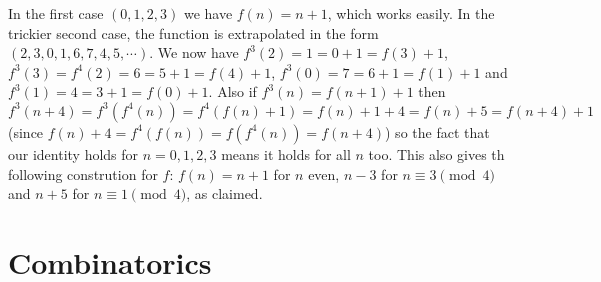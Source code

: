 \documentclass[11pt,a4paper]{article}
\begin{document}
	In the first case $(0, 1, 2, 3)$ we have $f(n)=n+1$, which works easily. 
	In the trickier second case, the function is extrapolated in the form $(2, 3, 0, 1, 6, 7, 4, 5, \cdots)$. We now have  $f^3(2)=1=0+1=f(3)+1$, $f^3(3)=f^4(2)=6=5+1=f(4)+1$, $f^3(0)=7=6+1=f(1)+1$ and $f^3(1)=4=3+1=f(0)+1$. Also if $f^3(n)=f(n+1)+1$ then $f^3(n+4)=f^3(f^4(n))=f^4(f(n)+1)=f(n)+1+4=f(n)+5=f(n+4)+1$ (since $f(n)+4=f^4(f(n))=f(f^4(n))=f(n+4)$) so the fact that our identity holds for $n=0, 1, 2, 3$ means it holds for all $n$ too. This also gives th following constrution for $f$: 
	$f(n)=n+1$ for $n$ even, $n-3$ for $n\equiv 3\pmod{4}$ and $n+5$ for $n\equiv 1\pmod{4}$, as claimed. 
	
\section*{Combinatorics}
\end{document}
